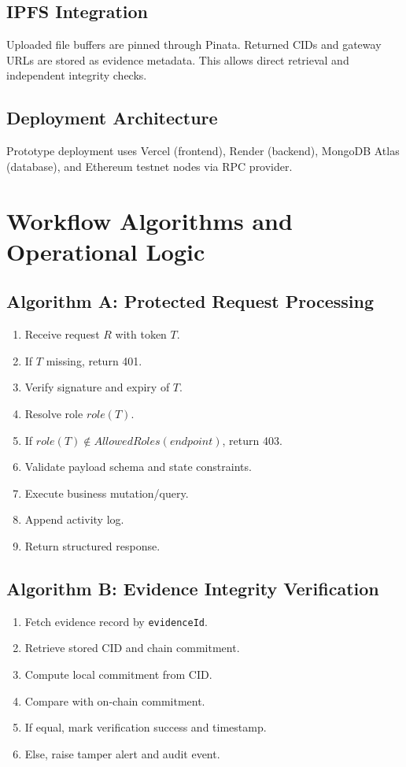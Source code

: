 \documentclass[conference]{IEEEtran}
\begin{document}
\subsection{IPFS Integration}
Uploaded file buffers are pinned through Pinata. Returned CIDs and gateway URLs are stored as evidence metadata. This allows direct retrieval and independent integrity checks.

\subsection{Deployment Architecture}
Prototype deployment uses Vercel (frontend), Render (backend), MongoDB Atlas (database), and Ethereum testnet nodes via RPC provider.

\section{Workflow Algorithms and Operational Logic}
\subsection{Algorithm A: Protected Request Processing}
\begin{enumerate}
    \item Receive request $R$ with token $T$.
    \item If $T$ missing, return 401.
    \item Verify signature and expiry of $T$.
    \item Resolve role $role(T)$.
    \item If $role(T) \notin AllowedRoles(endpoint)$, return 403.
    \item Validate payload schema and state constraints.
    \item Execute business mutation/query.
    \item Append activity log.
    \item Return structured response.
\end{enumerate}

\subsection{Algorithm B: Evidence Integrity Verification}
\begin{enumerate}
    \item Fetch evidence record by \texttt{evidenceId}.
    \item Retrieve stored CID and chain commitment.
    \item Compute local commitment from CID.
    \item Compare with on-chain commitment.
    \item If equal, mark verification success and timestamp.
    \item Else, raise tamper alert and audit event.
\end{enumerate}
\end{document}
